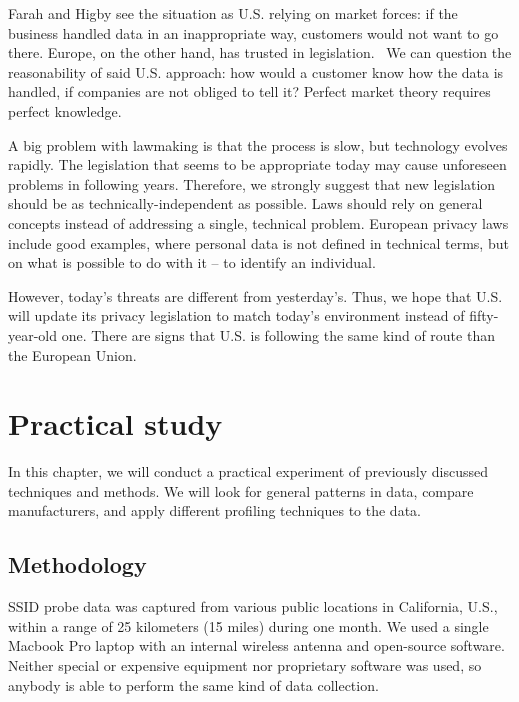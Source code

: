 \documentclass[12pt,a4paper,oneside,pdftex]{report}
\begin{document}
Farah and Higby see the situation as U.S. relying on market forces: if the business handled data in an inappropriate way, customers would not want to go there. Europe, on the other hand, has trusted in legislation.~\cite{farah2001commerce} We can question the reasonability of said U.S. approach: how would a customer know how the data is handled, if companies are not obliged to tell it? Perfect market theory requires perfect knowledge.

A big problem with lawmaking is that the process is slow, but technology evolves rapidly. The legislation that seems to be appropriate today may cause unforeseen problems in following years. Therefore, we strongly suggest that new legislation should be as technically-independent as possible. Laws should rely on general concepts instead of addressing a single, technical problem. European privacy laws include good examples, where personal data is not defined in technical terms, but on what is possible to do with it -- to identify an individual.

However, today's threats are different from yesterday's. Thus, we hope that U.S. will update its privacy legislation to match today's environment instead of fifty-year-old one. There are signs that U.S. is following the same kind of route than the European Union.



\chapter{Practical study}
\label{chapter:practical}

In this chapter, we will conduct a practical experiment of previously discussed techniques and methods. We will look for general patterns in data, compare manufacturers, and apply different profiling techniques to the data. 

\section{Methodology}
\label{sec:methods}

SSID probe data was captured from various public locations in California, U.S., within a range of 25 kilometers (15 miles) during one month. We used a single Macbook Pro laptop with an internal wireless antenna and open-source software. Neither special or expensive equipment nor proprietary software was used, so anybody is able to perform the same kind of data collection.
\end{document}
